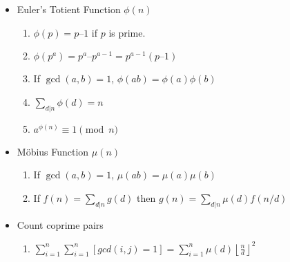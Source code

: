 \begin{itemize}
    \item Euler's Totient Function $\phi(n)$
    \begin{enumerate}
        \item $\phi(p) = p – 1$ if $p$ is prime. \\
        \item $\phi(p^a) = p^a – p^{a-1} = p^{a-1}(p – 1)$ \\
        \item If $\gcd(a, b) = 1$, $\phi(ab) = \phi(a)\phi(b)$ \\
        \item $\sum_{d|n}\phi(d) = n$
        \item $a^{\phi(n)} \equiv 1 \pmod n$
    \end{enumerate}
    \item Möbius Function $\mu(n)$
    \begin{enumerate}
        \item If $\gcd(a, b) = 1$, $\mu(ab) = \mu(a)\mu(b)$ \\
        \item If $f(n) = \sum_{d|n}g(d)$ then $g(n) = \sum_{d|n}\mu(d)f(n/d)$
    \end{enumerate}
    \item Count coprime pairs
    \begin{enumerate}
        \item $\sum_{i=1}^{n}\sum_{i=1}^{n} [gcd(i,j)=1] = \sum_{i=1}^{n}\mu(d) \left\lfloor \frac{n}{d}\right\rfloor^2$
    \end{enumerate}
\end{itemize}
